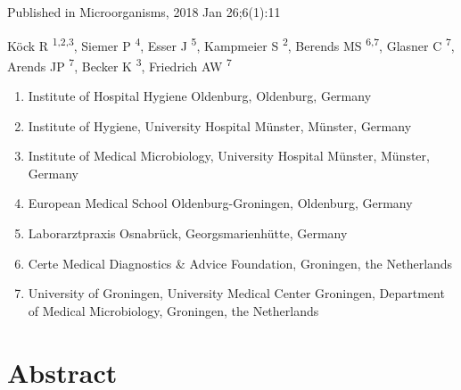 \documentclass[
]{book}
\providecommand{\tightlist}{%
  \setlength{\itemsep}{0pt}\setlength{\parskip}{0pt}}
\begin{document}
Published in Microorganisms, 2018 Jan 26;6(1):11

Köck R \textsuperscript{1,2,3}, Siemer P \textsuperscript{4}, Esser J \textsuperscript{5}, Kampmeier S \textsuperscript{2}, Berends MS \textsuperscript{6,7}, Glasner C \textsuperscript{7}, Arends JP \textsuperscript{7}, Becker K \textsuperscript{3}, Friedrich AW \textsuperscript{7}

\begin{enumerate}
\def\labelenumi{\arabic{enumi}.}
\tightlist
\item
  Institute of Hospital Hygiene Oldenburg, Oldenburg, Germany
\item
  Institute of Hygiene, University Hospital Münster, Münster, Germany
\item
  Institute of Medical Microbiology, University Hospital Münster, Münster, Germany
\item
  European Medical School Oldenburg-Groningen, Oldenburg, Germany
\item
  Laborarztpraxis Osnabrück, Georgsmarienhütte, Germany
\item
  Certe Medical Diagnostics \& Advice Foundation, Groningen, the Netherlands
\item
  University of Groningen, University Medical Center Groningen, Department of Medical Microbiology, Groningen, the Netherlands
\end{enumerate}

\hypertarget{abstract-6}{%
\section*{Abstract}\label{abstract-6}}
\end{document}
